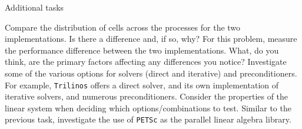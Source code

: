 \documentclass[11pt]{exam}
\makeatletter
\newcommand{\makeheader}[3]{%
\setcounter{question}{0}
\begin{center}
{\sc Numerical Solution of PDEs Using the Finite Element Method}\vspace{2ex}\\
{\sc Exercise #1:\ \ \ #2}\vspace{2ex}\\
\begin{tabular*}{\textwidth}{ll @{\extracolsep{\fill}}r}
Jean-Paul Pelteret & (\url{jean-paul.pelteret@fau.de}) & \multirow{2}{*}{#3} \\
Luca Heltai & (\url{luca.heltai@sissa.it}) & \\
\end{tabular*}
\end{center}
}
\newcommand{\makeresources}[1]{%
\rule{\textwidth}{0.6mm}
\textbf{Some useful resources}\\[1.5ex]
#1 \par
\rule{\textwidth}{0.6mm}
}
\makeatother
\begin{document}
\begin{questions}

\question Additional tasks
\begin{parts}
\bonuspart Compare the distribution of cells across the processes for the two implementations. 
Is there a difference and, if so, why?
\bonuspart For this problem, measure the performance difference between the two implementations. 
What, do you think, are the primary factors affecting any differences you notice?
\bonuspart Investigate some of the various options for solvers (direct and iterative) and preconditioners.
For example, \verb|Trilinos| offers a direct solver, and its own implementation of iterative solvers, and numerous preconditioners.
Consider the properties of the linear system when deciding which options/combinations to test.
\bonuspart Similar to the previous task, investigate the use of \verb|PETSc| as the parallel linear algebra library.
\end{parts}

\end{questions}


%
%
%
%
%
%
\end{document}
